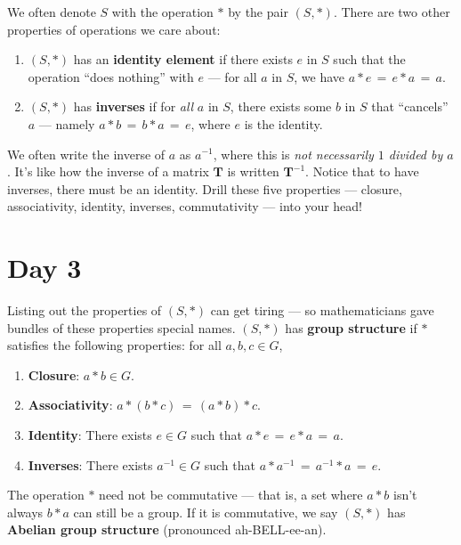 \documentclass[11pt]{article}
\newcommand{\mat}[1]{\mathbf{#1}}
\begin{document}
We often denote $S$ with the operation $\ast$ by the pair $(S, \ast)$. There are two other properties of operations we care about:
\begin{enumerate}
  \item $(S, \ast)$ has an \textbf{identity element} if there exists $e$ in $S$ such that the operation ``does nothing'' with $e$ --- for all $a$ in $S$, we have $a \ast e \, = \, e \ast a \, = \, a$.
  \item $(S, \ast)$ has \textbf{inverses} if for \textit{all} $a$ in $S$, there exists some $b$ in $S$ that ``cancels'' $a$ --- namely $a \ast b \, = \, b \ast a \, = \, e$, where $e$ is the identity. 
\end{enumerate}
We often write the inverse of $a$ as $a^{-1}$, where this is \textit{not necessarily $1$ divided by $a$}. It's like how the inverse of a matrix $\mat{T}$ is written $\mat{T}^{-1}$. Notice that to have inverses, there must be an identity. Drill these five properties --- closure, associativity, identity, inverses, commutativity --- into your head! 

\newpage


\section{Day 3}

Listing out the properties of $(S, \ast)$ can get tiring --- so mathematicians gave bundles of these properties special names. $(S, \ast)$ has \textbf{group structure} if $\ast$ satisfies the following properties: for all $a, b, c \in G$,
\begin{enumerate}
  \item \textbf{Closure}: $a \ast b \in G$.
  \item \textbf{Associativity}: $a \ast (b \ast c) \, = \, (a \ast b) \ast c$.
  \item \textbf{Identity}: There exists $e \in G$ such that $a \ast e \, = \, e \ast a \, = \, a$.
  \item \textbf{Inverses}: There exists $a^{-1} \in G$ such that $a \ast a^{-1} \, = \, a^{-1} \ast a \, = \, e$.
\end{enumerate}
The operation $\ast$ need not be commutative --- that is, a set where $a \ast b$ isn't always $b \ast a$ can still be a group. If it is commutative, we say $(S, \ast)$ has \textbf{Abelian group structure} (pronounced ah-BELL-ee-an).

\end{document}
